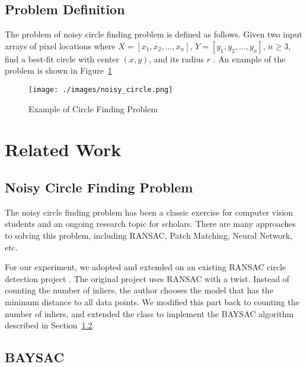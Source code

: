 \documentclass[10pt,twocolumn,letterpaper]{article}
\begin{document}
\subsection{Problem Definition}

The problem of noisy circle finding problem is defined as follows. Given two input arrays of pixel locations where $X = [x_{1}, x_{2}, \dots, x_{n}]$, $Y = [y_{1}, y_{2}, \dots, y_{n}]$, $n \geq 3$, find a best-fit circle with center $(x, y)$, and its radius $r$ \cite{NoisyCircleFindingProblem}. An example of the problem is shown in Figure~\ref{fig:circle_finding}

\begin{figure}[!htp]
   \centering
   \texttt{[image: ./images/noisy\_circle.png]}
   \caption{Example of Circle Finding Problem}
   \label{fig:circle_finding}
\end{figure}


\section{Related Work}
\label{section:related_work}


\subsection{Noisy Circle Finding Problem}

The noisy circle finding problem has been a classic exercise for computer vision students and an ongoing research topic for scholars. There are many approaches to solving this problem, including RANSAC, Patch Matching, Neural Network, etc.

For our experiment, we adopted and extended on an existing RANSAC circle detection project \cite{RansacGitHub}. The original project uses RANSAC with a twist. Instead of counting the number of inliers, the author chooses the model that has the minimum distance to all data points. We modified this part back to counting the number of inliers, and extended the class to implement the BAYSAC algorithm described in Section~\ref{section:baysac}.


\subsection{BAYSAC}
\label{section:baysac}
\end{document}
